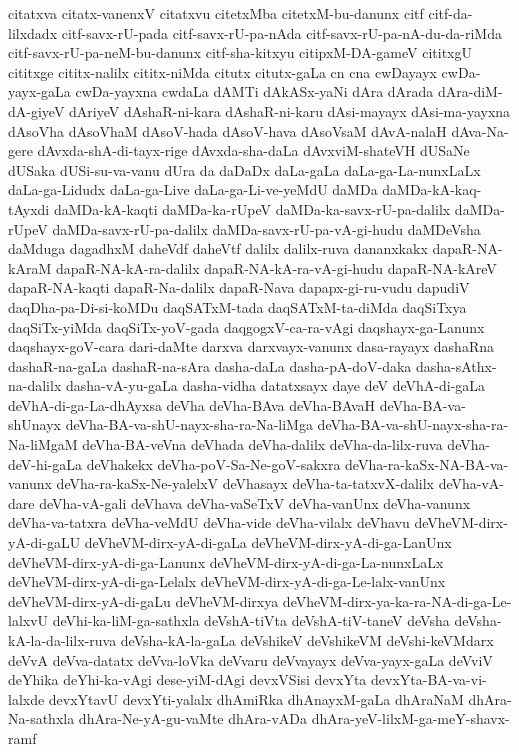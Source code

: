 {citatxva
citatx-vanenxV
citatxvu
citetxMba
citetxM-bu-danunx
citf
citf-da-lilxdadx
citf-savx-rU-pada
citf-savx-rU-pa-nAda
citf-savx-rU-pa-nA-du-da-riMda
citf-savx-rU-pa-neM-bu-danunx
citf-sha-kitxyu
citipxM-DA-gameV
cititxgU
cititxge
cititx-nalilx
cititx-niMda
citutx
citutx-gaLa
cn
cna
cwDayayx
cwDa-yayx-gaLa
cwDa-yayxna
cwdaLa
dAMTi
dAkASx-yaNi
dAra
dArada
dAra-diM-dA-giyeV
dAriyeV
dAshaR-ni-kara
dAshaR-ni-karu
dAsi-mayayx
dAsi-ma-yayxna
dAsoVha
dAsoVhaM
dAsoV-hada
dAsoV-hava
dAsoVsaM
dAvA-nalaH
dAva-Na-gere
dAvxda-shA-di-tayx-rige
dAvxda-sha-daLa
dAvxviM-shateVH
dUSaNe
dUSaka
dUSi-su-va-vanu
dUra
da
daDaDx
daLa-gaLa
daLa-ga-La-nunxLaLx
daLa-ga-Lidudx
daLa-ga-Live
daLa-ga-Li-ve-yeMdU
daMDa
daMDa-kA-kaq-tAyxdi
daMDa-kA-kaqti
daMDa-ka-rUpeV
daMDa-ka-savx-rU-pa-dalilx
daMDa-rUpeV
daMDa-savx-rU-pa-dalilx
daMDa-savx-rU-pa-vA-gi-hudu
daMDeVsha
daMduga
dagadhxM
daheVdf
daheVtf
dalilx
dalilx-ruva
dananxkakx
dapaR-NA-kAraM
dapaR-NA-kA-ra-dalilx
dapaR-NA-kA-ra-vA-gi-hudu
dapaR-NA-kAreV
dapaR-NA-kaqti
dapaR-Na-dalilx
dapaR-Nava
dapapx-gi-ru-vudu
dapudiV
daqDha-pa-Di-si-koMDu
daqSATxM-tada
daqSATxM-ta-diMda
daqSiTxya
daqSiTx-yiMda
daqSiTx-yoV-gada
daqgogxV-ca-ra-vAgi
daqshayx-ga-Lanunx
daqshayx-goV-cara
dari-daMte
darxva
darxvayx-vanunx
dasa-rayayx
dashaRna
dashaR-na-gaLa
dashaR-na-sAra
dasha-daLa
dasha-pA-doV-daka
dasha-sAthx-na-dalilx
dasha-vA-yu-gaLa
dasha-vidha
datatxsayx
daye
deV
deVhA-di-gaLa
deVhA-di-ga-La-dhAyxsa
deVha
deVha-BAva
deVha-BAvaH
deVha-BA-va-shUnayx
deVha-BA-va-shU-nayx-sha-ra-Na-liMga
deVha-BA-va-shU-nayx-sha-ra-Na-liMgaM
deVha-BA-veVna
deVhada
deVha-dalilx
deVha-da-lilx-ruva
deVha-deV-hi-gaLa
deVhakekx
deVha-poV-Sa-Ne-goV-sakxra
deVha-ra-kaSx-NA-BA-va-vanunx
deVha-ra-kaSx-Ne-yalelxV
deVhasayx
deVha-ta-tatxvX-dalilx
deVha-vA-dare
deVha-vA-gali
deVhava
deVha-vaSeTxV
deVha-vanUnx
deVha-vanunx
deVha-va-tatxra
deVha-veMdU
deVha-vide
deVha-vilalx
deVhavu
deVheVM-dirx-yA-di-gaLU
deVheVM-dirx-yA-di-gaLa
deVheVM-dirx-yA-di-ga-LanUnx
deVheVM-dirx-yA-di-ga-Lanunx
deVheVM-dirx-yA-di-ga-La-nunxLaLx
deVheVM-dirx-yA-di-ga-Lelalx
deVheVM-dirx-yA-di-ga-Le-lalx-vanUnx
deVheVM-dirx-yA-di-gaLu
deVheVM-dirxya
deVheVM-dirx-ya-ka-ra-NA-di-ga-Le-lalxvU
deVhi-ka-liM-ga-sathxla
deVshA-tiVta
deVshA-tiV-taneV
deVsha
deVsha-kA-la-da-lilx-ruva
deVsha-kA-la-gaLa
deVshikeV
deVshikeVM
deVshi-keVMdarx
deVvA
deVva-datatx
deVva-loVka
deVvaru
deVvayayx
deVva-yayx-gaLa
deVviV
deYhika
deYhi-ka-vAgi
dese-yiM-dAgi
devxVSisi
devxYta
devxYta-BA-va-vi-lalxde
devxYtavU
devxYti-yalalx
dhAmiRka
dhAnayxM-gaLa
dhAraNaM
dhAra-Na-sathxla
dhAra-Ne-yA-gu-vaMte
dhAra-vADa
dhAra-yeV-lilxM-ga-meY-shavx-ramf
}

